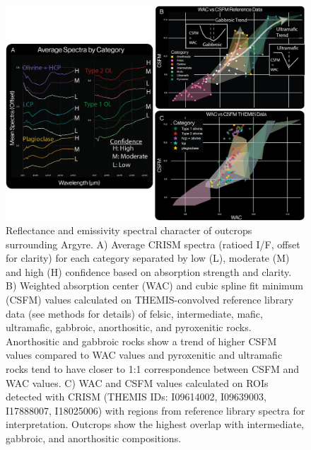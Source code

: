 \documentclass[11pt]{article}
\begin{document}
\begin{figure}
    \centering
    \includegraphics[width=\textwidth]
    {figures/03_spectra_figv3.png}
    \caption{Reflectance and emissivity spectral character of outcrops surrounding Argyre. A) Average CRISM spectra (ratioed I/F, offset for clarity) for each category separated by low (L), moderate (M) and high (H) confidence based on absorption strength and clarity. B) Weighted absorption center (WAC) and cubic spline fit minimum (CSFM) values calculated on THEMIS-convolved reference library data (see methods for details) of felsic, intermediate, mafic, ultramafic, gabbroic, anorthositic, and pyroxenitic rocks. Anorthositic and gabbroic rocks show a trend of higher CSFM values compared to WAC values and pyroxenitic and ultramafic rocks tend to have closer to 1:1 correspondence between CSFM and WAC values. C) WAC and CSFM values calculated on ROIs detected with CRISM (THEMIS IDs: I09614002, I09639003, I17888007, I18025006) with regions from reference library spectra for interpretation. Outcrops show the highest overlap with intermediate, gabbroic, and anorthositic compositions.}
    \label{fig:spectra}
\end{figure}
\end{document}

